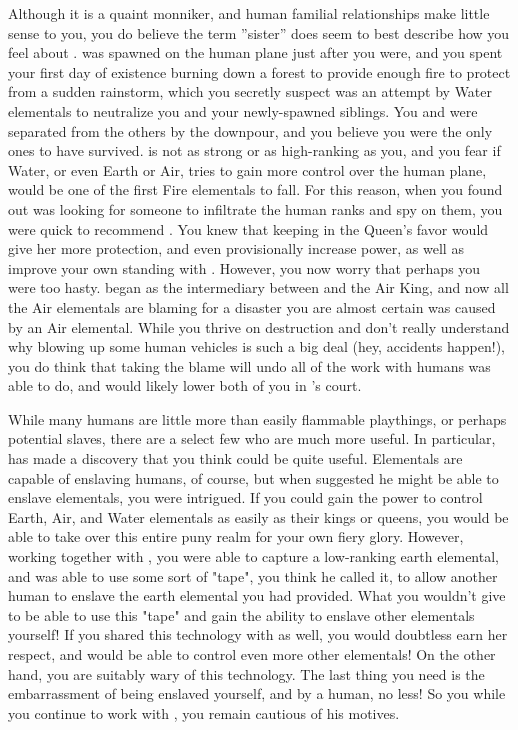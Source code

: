 \documentclass[char]{elementals}
\begin{document}
Although it is a quaint monniker, and human familial relationships make little sense to you, you do believe the term ''sister'' does seem to best describe how you feel about \cJuliet{}.  \cJuliet{\they} was spawned on the human plane just after you were, and you spent your first day of existence burning down a forest to provide enough fire to protect \cJuliet{\them} from a sudden rainstorm, which you secretly suspect was an attempt by Water elementals to neutralize you and your newly-spawned siblings.  You and \cJuliet{} were separated from the others by the downpour, and you believe you were the only ones to have survived. \cJuliet{\they} is not as strong or as high-ranking as you, and you fear if Water, or even Earth or Air, tries to gain more control over the human plane, \cJuliet{\they} would be one of the first Fire elementals to fall. For this reason, when you found out \cQueen{} was looking for someone to infiltrate the human ranks and spy on them, you were quick to recommend \cJuliet{}.  You knew that keeping \cJuliet{\them} in the Queen's favor would give her more protection, and even provisionally increase  power, as well as improve your own standing with \cQueen{}.  However, you now worry that perhaps you were too hasty.  \cJuliet{} began as the intermediary between \cQueen{} and the Air King, and now all the Air elementals are blaming \cJuliet{\them} for a disaster you are almost certain was caused by an Air elemental.  While you thrive on destruction and don't really understand why blowing up some human vehicles is such a big deal (hey, accidents happen!), you do think that \cJuliet{} taking the blame will undo all of the work with humans \cJuliet{\they} was able to do, and would likely lower both of you in \cQueen{}'s court.

While many humans are little more than easily flammable playthings, or perhaps potential slaves, there are a select few who are much more useful.  In particular, \cMS{\intro} has made a discovery that you think could be quite useful.  Elementals are capable of enslaving humans, of course, but when \cMS{} suggested he might be able to enslave elementals, you were intrigued.  If you could gain the power to control Earth, Air, and Water elementals as easily as their kings or queens, you would be able to take over this entire puny realm for your own fiery glory.  However, working together with \cMS{}, you were able to capture a low-ranking earth elemental, and \cMS{} was able to use some sort of "tape", you think he called it, to allow another human to enslave the earth elemental you had provided.  What you wouldn't give to be able to use this "tape" and gain the ability to enslave other elementals yourself!  If you shared this technology with \cQueen{} as well, you would doubtless earn her respect, and  would be able to control even more other elementals!  On the other hand, you are suitably wary of this technology.  The last thing you need is the embarrassment of being enslaved yourself, and by a human, no less!  So you while you continue to work with \cMS{}, you remain cautious of his motives.
\end{document}
